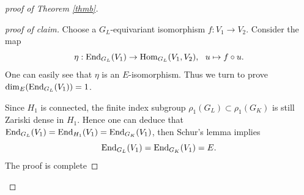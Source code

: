 \documentclass[20pt, oneside]{article}   	%
\theoremstyle{definition}
\begin{document}
\begin{proof}[proof of Theorem \ref{thmb}]
\begin{proof}[proof of claim]

Choose a $G_L$-equivariant isomorphism $f:V_1\rightarrow V_2$. Consider the map
$$\eta:{\rm End}_{G_L}(V_1)\rightarrow {\rm Hom}_{G_L}(V_1,V_2),\ \ u\mapsto f\circ u.$$
One can easily see that $\eta$ is an $E$-isomorphism. Thus we turn to prove ${\rm dim}_E({\rm End}_{G_L}(V_1))=1$.

Since $H_1$ is connected, the finite index subgroup $\rho_1(G_L)\subset \rho_1(G_K)$ is still Zariski dense in $H_1$. Hence one can deduce that ${\rm End}_{G_L}(V_1)={\rm End}_{H_1}(V_1)={\rm End}_{G_K}(V_1)$, then Schur's lemma implies
$${\rm End}_{G_L}(V_1)={\rm End}_{G_K}(V_1)=E.$$
The proof is complete
\end{proof}
\end{proof}





\end{document}
